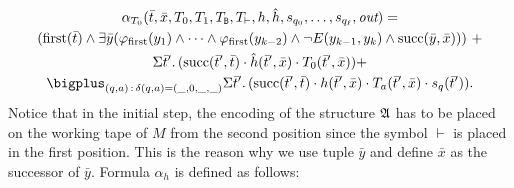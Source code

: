 \begin{multline*}
\alpha_{T_0}(\bar{t},\bar{x},T_0,T_1,T_{\ttB},T_{\vdash},h,\hat{h},s_{q_0},\ldots,s_{q_{\ell}},\out) = \\ 
(\first(\bar{t}) \wedge \exists\bar{y}(\varphi_{\text{\rm first}}(y_1) \wedge \cdots \wedge \varphi_{\text{\rm first}}(y_{k-2}) \wedge\neg E(y_{k-1},y_k) \wedge \successor(\bar{y},\bar{x}) ))\ + \\
\sa{\bar{t}'}(\successor(\bar{t}',\bar{t}) \mult \hat{h}(\bar{t}',\bar{x}) \mult T_0(\bar{t}',\bar{x})) + \\
\bigplus_{(q,a) \,:\, \delta(q,a) = (\_,0,\_,\_)}\sa{\bar{t}'}(\successor(\bar{t}',\bar{t}) \mult h(\bar{t}',\bar{x}) \mult T_a(\bar{t}',\bar{x}) \mult s_{q}(\bar{t}')).
\end{multline*}
Notice that in the initial step, the encoding of the structure $\mathfrak{A}$ has to be placed on the working tape of $M$ from the second position since the symbol $\vdash$ is placed in the first position. This is the reason why we use tuple $\bar y$ and define $\bar x$ as the successor of $\bar y$.
Formula $\alpha_{h}$ is defined as follows:
